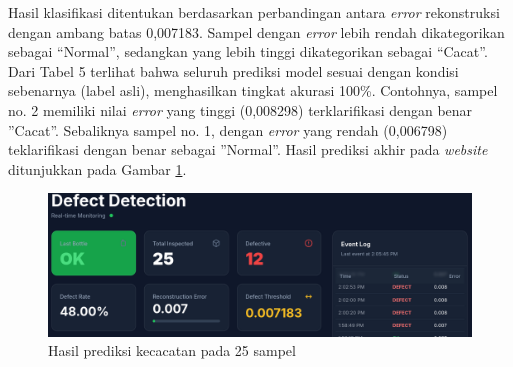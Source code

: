 Hasil klasifikasi ditentukan berdasarkan perbandingan antara \textit{error}
rekonstruksi dengan ambang batas 0,007183. Sampel dengan \textit{error} lebih
rendah dikategorikan sebagai “Normal”, sedangkan yang lebih tinggi
dikategorikan sebagai “Cacat”. Dari Tabel 5 terlihat bahwa seluruh
prediksi model sesuai dengan kondisi sebenarnya (label asli),
menghasilkan tingkat akurasi 100\%. Contohnya, sampel no. 2 memiliki
nilai \textit{error} yang tinggi (0,008298) terklarifikasi dengan benar
”Cacat”. Sebaliknya sampel no. 1, dengan \textit{error} yang rendah
(0,006798) teklarifikasi dengan benar sebagai ”Normal”. Hasil
prediksi akhir pada \textit{website} ditunjukkan pada Gambar
\ref{fig:web-25}.

\begin{figure}[H]
  \centering
  \includegraphics[width=\textwidth]{gambar/ss_web_25.png}
  \caption{Hasil prediksi kecacatan pada 25 sampel}
  \label{fig:web-25}
\end{figure}
\vspace{-1em}

